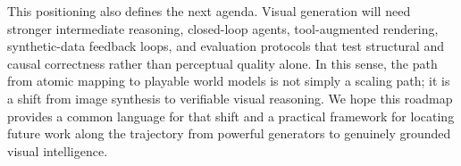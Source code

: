 \documentclass{llmxive}
\begin{document}
This positioning also defines the next agenda. Visual generation will need stronger intermediate reasoning, closed-loop agents, tool-augmented rendering, synthetic-data feedback loops, and evaluation protocols that test structural and causal correctness rather than perceptual quality alone. In this sense, the path from atomic mapping to playable world models is not simply a scaling path; it is a shift from image synthesis to verifiable visual reasoning. We hope this roadmap provides a common language for that shift and a practical framework for locating future work along the trajectory from powerful generators to genuinely grounded visual intelligence.














\end{document}
